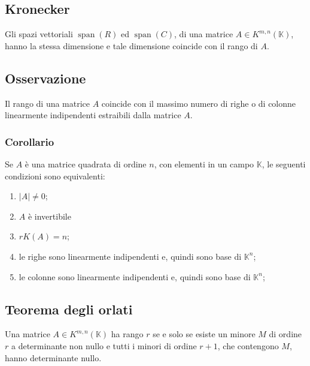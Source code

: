\documentclass{article}
\DeclareMathOperator{\Span}{span}
\begin{document}
\subsection{Kronecker}
Gli spazi vettoriali $\Span(R)$ ed $\Span(C)$, di una matrice $A\in K^{m,n}
    (\mathbb{K})$, hanno la stessa dimensione e tale dimensione coincide con il
rango di $A$.

\subsection{Osservazione}
Il rango di una matrice $A$ coincide con il massimo numero di righe o di
colonne linearmente indipendenti estraibili dalla matrice $A$.

\subsubsection{Corollario}
Se $A$ è una matrice quadrata di ordine $n$, con elementi in un campo
$\mathbb{K}$, le seguenti condizioni sono equivalenti:
\begin{enumerate}
    \item $|A|\ne0$;
    \item $A$ è invertibile
    \item $rK (A) = n$;
    \item le righe sono linearmente indipendenti e, quindi sono base di $\mathbb{K}^n$;
    \item le colonne sono linearmente indipendenti e, quindi sono base di $\mathbb{K}^n$;
\end{enumerate}

\subsection{Teorema degli orlati}
Una matrice $A\in K^{m,n} (\mathbb{K})$ ha rango $r$ se e solo se esiste un
minore $M$ di ordine $r$ a determinante non nullo e tutti i minori di ordine
$r+1$, che contengono $M$, hanno determinante nullo.
\end{document}
